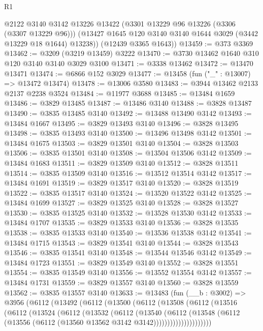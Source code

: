 \begin{lexlean}{R1}
\begin{coremodule}
        @2122
        @3140
        @3142
        @13226
        @13422
        (@3301 @13229 @96 @13226 (@3306 (@3307 @13229 @96)))
        (@13427 @1645 @120 @3140 @3140 @1644 @3029 (@3442 @13229 @18 @1644) @13238))
      (@12439 @3365 @1643))
@13459 := @373 @3369
@13462 := @3209 (@3219 @13459) @3222
@13470 := @3730 @13462 @1640 @310 @120 @3140 @3140 @3029 @3100
@13471 := @3338 @13462
@13472 := @13470 @13471
@13474 := @6866 @152 @3029
@13477 := @13458 (fun ("_" : @13007) => @13472 @13474)
@13478 := @13006 @3580
@13483 := @3944 @13462 @2133 @2137 @2238 @3524
@13484 := @11977 @3688
@13485 := @13484 @1659
@13486 := @3829 @13485
@13487 := @13486 @3140
@13488 := @3828 @13487
@13490 := @3835 @13485 @3140
@13492 := @13488 @13490 @3142
@13493 := @13484 @1667
@13495 := @3829 @13493 @3140
@13496 := @3828 @13495
@13498 := @3835 @13493 @3140
@13500 := @13496 @13498 @3142
@13501 := @13484 @1675
@13503 := @3829 @13501 @3140
@13504 := @3828 @13503
@13506 := @3835 @13501 @3140
@13508 := @13504 @13506 @3142
@13509 := @13484 @1683
@13511 := @3829 @13509 @3140
@13512 := @3828 @13511
@13514 := @3835 @13509 @3140
@13516 := @13512 @13514 @3142
@13517 := @13484 @1691
@13519 := @3829 @13517 @3140
@13520 := @3828 @13519
@13522 := @3835 @13517 @3140
@13524 := @13520 @13522 @3142
@13525 := @13484 @1699
@13527 := @3829 @13525 @3140
@13528 := @3828 @13527
@13530 := @3835 @13525 @3140
@13532 := @13528 @13530 @3142
@13533 := @13484 @1707
@13535 := @3829 @13533 @3140
@13536 := @3828 @13535
@13538 := @3835 @13533 @3140
@13540 := @13536 @13538 @3142
@13541 := @13484 @1715
@13543 := @3829 @13541 @3140
@13544 := @3828 @13543
@13546 := @3835 @13541 @3140
@13548 := @13544 @13546 @3142
@13549 := @13484 @1723
@13551 := @3829 @13549 @3140
@13552 := @3828 @13551
@13554 := @3835 @13549 @3140
@13556 := @13552 @13554 @3142
@13557 := @13484 @1731
@13559 := @3829 @13557 @3140
@13560 := @3828 @13559
@13562 := @3835 @13557 @3140
@13633 := @13483
    (fun (__b : @3002) =>
    @3956
      (@6112
        (@13492
          (@6112
            (@13500
              (@6112
                (@13508
                  (@6112
                    (@13516
                      (@6112
                        (@13524
                          (@6112
                            (@13532
                              (@6112
                                (@13540
                                  (@6112
                                    (@13548
                                      (@6112
                                        (@13556
                                          (@6112 (@13560 @13562 @3142 @3142)))))))))))))))))))))

\end{coremodule}
\end{lexlean}
